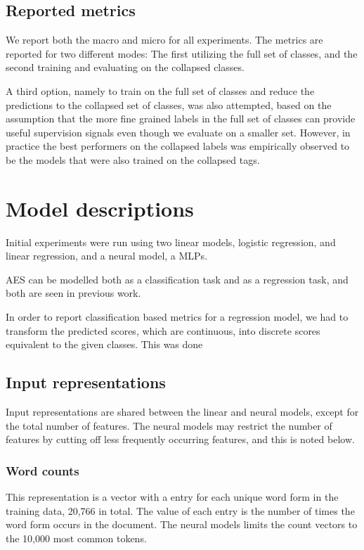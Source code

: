 \subsection{Reported metrics}

We report both the macro and micro \FI for all experiments. The metrics are
reported for two different modes: The first utilizing the full set of
classes, and the second training and evaluating on the collapsed classes.

A third option, namely to train on the full set of classes and reduce the
predictions to the collapsed set of classes, was also attempted, based on the
assumption that the more fine grained labels in the full set of classes can
provide useful supervision signals even though we evaluate on a smaller set.
However, in practice the best performers on the collapsed labels was
empirically observed to be the models that were also trained on the collapsed
tags.


\section{Model descriptions}

Initial experiments were run using two linear models, logistic regression,
and linear regression, and a neural model, a \acp{MLP}.

\ac{AES} can be modelled both as a classification task and as a regression
task, and both are seen in previous work.

In order to report classification based metrics for a regression model, we
had to transform the predicted scores, which are continuous, into discrete
scores equivalent to the given classes. This was done 


\subsection{Input representations}

Input representations are shared between the linear and neural models, except
for the total number of features. The neural models may restrict the number
of features by cutting off less frequently occurring features, and this is
noted below.

\subsubsection*{Word counts}

This representation is a vector with a entry for each unique word form in the
training data, 20,766 in total. The value of each entry is the number of
times the word form occurs in the document. The neural models limits the
count vectors to the 10,000 most common tokens.

